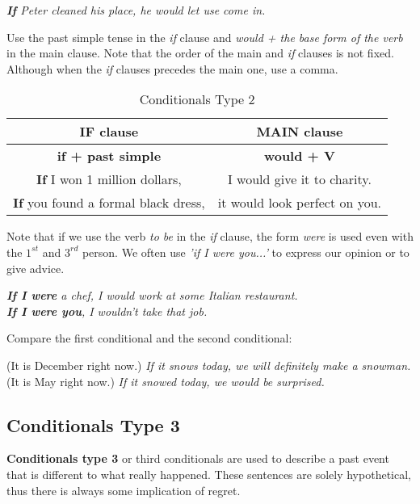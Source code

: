 \documentclass[hidelinks,10pt,a4paper]{article}
\begin{document}
\begin{center}
	\textit{\textbf{If} Peter cleaned his place, he would let use come in.}
\end{center}

Use the past simple tense in the \textit{if} clause and \textit{would + the base form of the verb} in the main clause. Note that the order of the main and \textit{if} clauses is not fixed. Although when the \textit{if} clauses precedes the main one, use a comma.

\begin{table}[h]
\begin{center}
\begin{tabular}{|c|c|}
	\hline
	\textbf{IF clause} & \textbf{MAIN clause} \\ \hline
	\textbf{if + past simple} & \textbf{would + V} \\ \hline
	\textbf{If} I won 1 million dollars, & I would give it to charity. \\ \hline
	\textbf{If} you found a formal black dress, & it would look perfect on you. \\ \hline
\end{tabular}
\end{center}
\caption{Conditionals Type 2} \label{tab:ct2t}
\end{table}

Note that if we use the verb \textit{to be} in the \textit{if} clause, the form \textit{were} is used even with the $1^{st}$ and $3^{rd}$ person. We often use \textit{'if I were you...'} to express our opinion or to give advice.

\begin{center}
	\textit{\textbf{If I were} a chef, I would work at some Italian restaurant. }\\
	\textit{\textbf{If I were you}, I wouldn't take that job.}
\end{center}

Compare the first conditional and the second conditional:

\begin{center}
	(It is December right now.) \textit{If it snows today, we will definitely make a snowman.}\\
	(It is May right now.) \textit{If it snowed today, we would be surprised.}
\end{center}

\subsection{Conditionals Type 3}
\textbf{Conditionals type 3} or third conditionals are used to describe a past event that is different to what really happened. These sentences are solely hypothetical, thus there is always some implication of regret.
\end{document}
